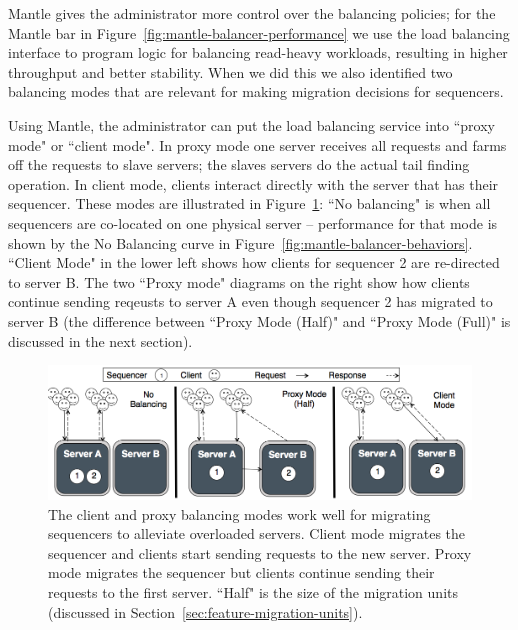 \documentclass[preprint]{sigplanconf-eurosys}
\begin{document}
Mantle gives the administrator more control over the balancing policies; for
the Mantle bar in Figure~\ref{fig:mantle-balancer-performance} we use the load
balancing interface to program logic for balancing read-heavy workloads,
resulting in higher throughput and better stability.  When we did this we also
identified two balancing modes that are relevant for making migration decisions
for sequencers. 

Using Mantle, the administrator can put the load balancing service into ``proxy
mode" or ``client mode". In proxy mode one server receives all requests and
farms off the requests to slave servers; the slaves servers do the actual tail
finding operation. In client mode, clients interact directly with the server
that has their sequencer.  These modes are illustrated in
Figure~\ref{fig:mantle-modes}: ``No balancing" is when all sequencers are
co-located on one physical server -- performance for that mode is shown by the
No Balancing curve in Figure~\ref{fig:mantle-balancer-behaviors}.  ``Client
Mode" in the lower left shows how clients for sequencer 2 are re-directed to
server B. The two ``Proxy mode" diagrams on the right show how clients continue
sending reqeusts to server A even though sequencer 2 has migrated to server B
(the difference between ``Proxy Mode (Half)" and ``Proxy Mode (Full)" is
discussed in the next section).

\begin{figure}[t!]
\centering
\includegraphics{figures/mantle-modes.png}
\caption{The client and proxy balancing modes work well for migrating
sequencers to alleviate overloaded servers. Client mode migrates the sequencer
and clients start sending requests to the new server. Proxy mode migrates the
sequencer but clients continue sending their requests to the first server.
``Half" is the size of the migration units (discussed in
Section~\ref{sec:feature-migration-units}).}\label{fig:mantle-modes}
\end{figure}
\end{document}
